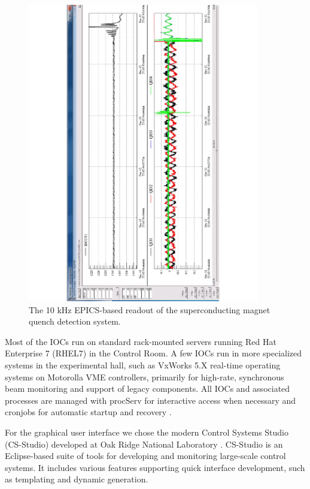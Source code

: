 \begin{figure}[t]\centering
\includegraphics[width=0.9\textwidth]{img/tordaq}
\caption{The 10 kHz EPICS-based readout of the superconducting magnet quench detection system.\label{fig:tordaq}}
\end{figure}

Most of the IOCs run on standard rack-mounted servers running Red Hat Enterprise 7 (RHEL7) in the Control Room.  A few IOCs run in more specialized systems in the experimental hall, such as VxWorks 5.X real-time operating systems on Motorolla VME controllers, primarily for high-rate, synchronous beam monitoring and support of legacy components.  All IOCs and associated processes are managed with procServ for interactive access when necessary and cronjobs for automatic startup and recovery \cite{procserv-website}.

For the graphical user interface we chose the modern Control Systems Studio (CS-Studio) developed at Oak Ridge National Laboratory \cite{css-website}.   CS-Studio is an Eclipse-based suite of tools for developing and monitoring large-scale control systems.  It includes various features supporting quick interface development, such as templating and dynamic generation.

